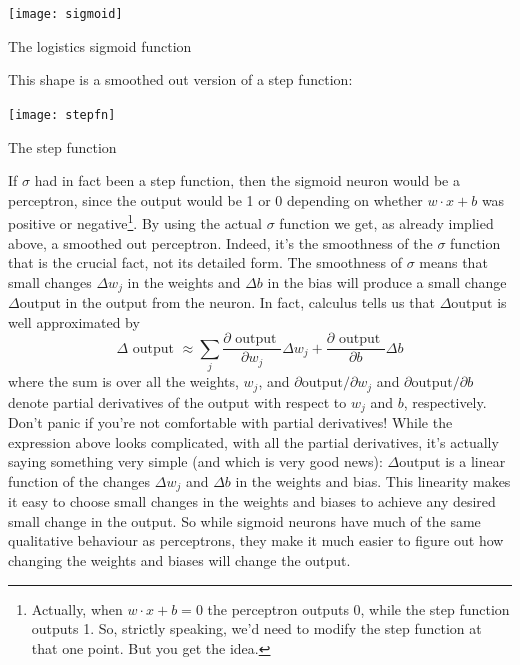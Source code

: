 \begin{marginfigure}[-110mm]
\texttt{[image: sigmoid]}
\caption{The logistics sigmoid function}
\label{fig:ch01-logistitcssigmoid}
\end{marginfigure}


This shape is a smoothed out version of a step function:


\begin{marginfigure}[-35mm]
\texttt{[image: stepfn]}
\caption{The step function}
\label{fig:ch01-stepfn}
\end{marginfigure}



If $\sigma$ had in fact been a step function, then the sigmoid neuron would be a perceptron, since the output would be 1 or 0 depending on whether $w \cdot x+b$ was positive or negative\footnote{Actually, when  $w \cdot x+b=0$ the perceptron outputs 0, while the step function outputs 1. So, strictly speaking, we'd need to modify the step function at that one point. But you get the idea.}.
 By using the actual $\sigma$ function we get, as already implied above, a smoothed out perceptron. Indeed, it's the smoothness of the $\sigma$ function that is the crucial fact, not its detailed form. The smoothness of $\sigma$ means that small changes $\Delta w_j$ in the weights and $\Delta b$ in the bias will produce a small change $\Delta\textrm{output}$ in the output from the neuron. In fact, calculus tells us that $\Delta\textrm{output}$ is well approximated by 
\begin{equation}
\Delta \textrm { output } \approx \sum_{j} \frac{\partial \textrm { output }}{\partial w_{j}} \Delta w_{j}+\frac{\partial \textrm { output }}{\partial b} \Delta b
\label{eq:c01-05-partialderivsigmoid}
\end{equation}
where the sum is over all the weights, $w_j$, and $\partial\textrm{output}/\partial w_j$ and $\partial\textrm{output}/\partial b$ denote partial derivatives of the output with respect to $w_j$ and $b$, respectively. Don't panic if you're not comfortable with partial derivatives! While the expression above looks complicated, with all the partial derivatives, it's actually saying something very simple (and which is very good news):  $\Delta\textrm{output}$  is a linear function of the changes $\Delta w_j$ and $\Delta b$ in the weights and bias. This linearity makes it easy to choose small changes in the weights and biases to achieve any desired small change in the output. So while sigmoid neurons have much of the same qualitative behaviour as perceptrons, they make it much easier to figure out how changing the weights and biases will change the output.

